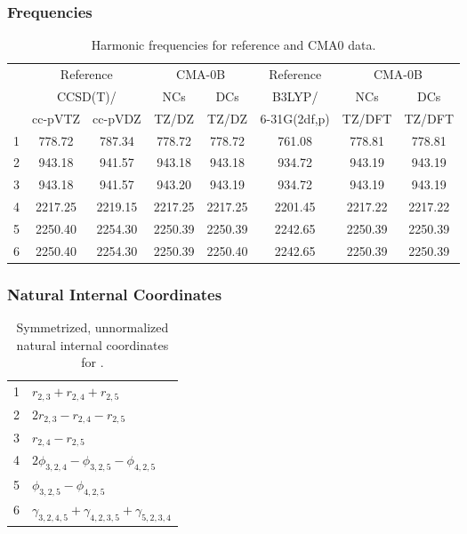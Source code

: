 \documentclass[10pt,oneside]{article}
\begin{document}
\clearpage

\subsubsection*{Frequencies}
\begin{table}[h!]
\centering
\caption{Harmonic frequencies for reference and CMA0 data.}
\begin{tabular}{cccccccc}
\toprule
{} & \multicolumn{2}{c}{Reference} & \multicolumn{2}{c}{CMA-0B} &    Reference & \multicolumn{2}{c}{CMA-0B} \\
{} & \multicolumn{2}{c}{CCSD(T)/} &     NCs &     DCs &       B3LYP/ &     NCs &     DCs \\
{} &   cc-pVTZ & cc-pVDZ &   TZ/DZ &   TZ/DZ & 6-31G(2df,p) &  TZ/DFT &  TZ/DFT \\
\midrule
1 &    778.72 &  787.34 &  778.72 &  778.72 &       761.08 &  778.81 &  778.81 \\
2 &    943.18 &  941.57 &  943.18 &  943.18 &       934.72 &  943.19 &  943.19 \\
3 &    943.18 &  941.57 &  943.20 &  943.19 &       934.72 &  943.19 &  943.19 \\
4 &   2217.25 & 2219.15 & 2217.25 & 2217.25 &      2201.45 & 2217.22 & 2217.22 \\
5 &   2250.40 & 2254.30 & 2250.39 & 2250.39 &      2242.65 & 2250.39 & 2250.39 \\
6 &   2250.40 & 2254.30 & 2250.39 & 2250.40 &      2242.65 & 2250.39 & 2250.39 \\
\bottomrule
\end{tabular}
\end{table}

\clearpage

\subsubsection*{Natural Internal Coordinates}
\begin{table}[h!]
\centering
\caption{Symmetrized, unnormalized natural internal coordinates for .}
\small
\begin{tabular}{ll}
  1   & $r_{2,3} + r_{2,4} + r_{2,5}$ \\
  2   & $2r_{2,3} - r_{2,4} - r_{2,5}$ \\
  3   & $r_{2,4} - r_{2,5}$ \\
  4   & $2\phi_{3,2,4} - \phi_{3,2,5} - \phi_{4,2,5}$ \\
  5   & $\phi_{3,2,5} - \phi_{4,2,5}$ \\
  6   & $\gamma_{3,2,4,5} + \gamma_{4,2,3,5} + \gamma_{5,2,3,4}$ \\
\end{tabular}
\end{table}
\end{document}
